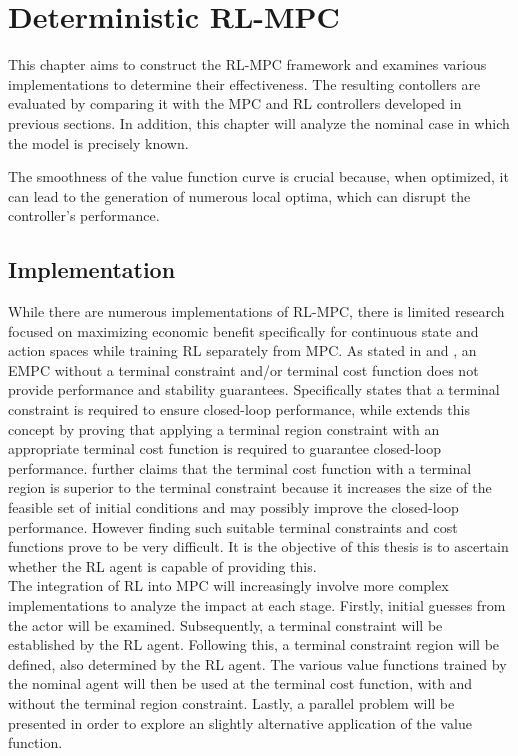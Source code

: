 \chapter{Deterministic RL-MPC}
\label{chapter:deterministic_RL_MPC}

This chapter aims to construct the RL-MPC framework and examines various implementations to determine their effectiveness. The resulting contollers are evaluated by comparing it with the MPC and RL controllers developed in previous sections. In addition, this chapter will analyze the nominal case in which the model is precisely known. 


The smoothness of the value function curve is crucial because, when optimized, it can lead to the generation of numerous local optima, which can disrupt the controller's performance.


\section{Implementation}
While there are numerous implementations of RL-MPC, there is limited research focused on maximizing economic benefit specifically for continuous state and action spaces while training RL separately from MPC. As stated in \cite{ellisTutorialReviewEconomic2014} and \cite{amritEconomicOptimizationUsing2011}, an EMPC without a terminal constraint and/or terminal cost function does not provide performance and stability guarantees. Specifically \cite{ellisTutorialReviewEconomic2014} states that a terminal constraint is required to ensure closed-loop performance, while \cite{amritEconomicOptimizationUsing2011} extends this concept by proving that applying a terminal region constraint with an appropriate terminal cost function is required to guarantee closed-loop performance. \cite{amritEconomicOptimizationUsing2011} further claims that the terminal cost function with a terminal region is superior to the terminal constraint because it increases the size of the feasible set of initial conditions and may possibly improve the closed-loop performance. However finding such suitable terminal constraints and cost functions prove to be very difficult. It is the objective of this thesis is to ascertain whether the RL agent is capable of providing this.\\

The integration of RL into MPC will increasingly involve more complex implementations to analyze the impact at each stage. Firstly, initial guesses from the actor will be examined. Subsequently, a terminal constraint will be established by the RL agent. Following this, a terminal constraint region will be defined, also determined by the RL agent. The various value functions trained by the nominal agent will then be used at the terminal cost function, with and without the terminal region constraint. Lastly, a parallel problem will be presented in order to explore an slightly alternative application of the value function.

